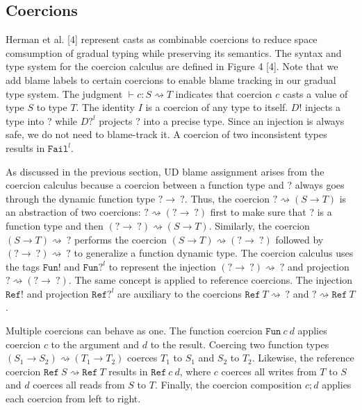 
\subsection{Coercions}
Herman et al. [4] represent casts as combinable coercions to reduce 
space comsumption of gradual typing while preserving its semantics. 
The syntax and type system for the coercion calculus are defined in 
Figure 4 [4]. Note that we add blame labels to certain coercions to 
enable blame tracking in our gradual type system. The judgment $\vdash c: S 
\rightsquigarrow T$ indicates that coercion $c$ casts a value of type 
$S$ to type $T$. The identity $I$ is a coercion of any type to itself. 
$D!$ injects a type into ? while $D?^l$ projects ? into a precise type. 
Since an injection is always safe, we do not need to blame-track it. 
A coercion of two inconsistent types results in $\texttt{Fail}^l$. 

As discussed in the previous section, UD blame assignment arises  
from the coercion calculus because a coercion 
between a function type and ? always goes through the 
dynamic function type $? \rightarrow \: ?$. Thus,
the coercion $? \rightsquigarrow (S \rightarrow T)$ is an 
abstraction of two coercions: $? \rightsquigarrow 
(? \rightarrow \: ?)$ first to make sure that ? is a function type 
and then $(? \rightarrow \: ?) \rightsquigarrow 
(S \rightarrow T)$. Similarly, the coercion $(S \rightarrow T) \rightsquigarrow \: ?$ 
performs the coercion $(S \rightarrow T) \rightsquigarrow (? \rightarrow \: ?)$ 
followed by $(? \rightarrow \: ?) \rightsquigarrow \: ?$ to 
generalize a function dynamic type.  
The coercion calculus uses the tags $\texttt{Fun}!$ and $\texttt{Fun}?^l$ 
to represent the injection $(? \rightarrow \: ?) \rightsquigarrow \: ?$ and 
projection $? \rightsquigarrow (? \rightarrow \: ?)$. The same concept is 
applied to reference coercions. The injection $\texttt{Ref}!$ and 
projection $\texttt{Ref}?^l$ are auxiliary to the coercions $\texttt{Ref} \: T 
\rightsquigarrow \: ?$ and $? \rightsquigarrow \texttt{Ref} \: T$.

Multiple coercions can behave as one. The function coercion $\texttt{Fun} \: c \: d$ 
applies coercion $c$ to the argument and $d$ to the result. Coercing 
two function types $(S_1 \rightarrow S_2) \rightsquigarrow (T_1 \rightarrow T_2)$ 
coerces $T_1$ to $S_1$ and $S_2$ to $T_2$. Likewise, the reference coercion 
$\texttt{Ref} \: S \rightsquigarrow \texttt{Ref} \: T$ results in 
$\texttt{Ref} \: c \: d$, where $c$ coerces all writes from 
$T$ to $S$ and $d$ coerces all reads from $S$ to $T$. Finally, the coercion 
composition $c;d$ applies each coercion from left to right.

